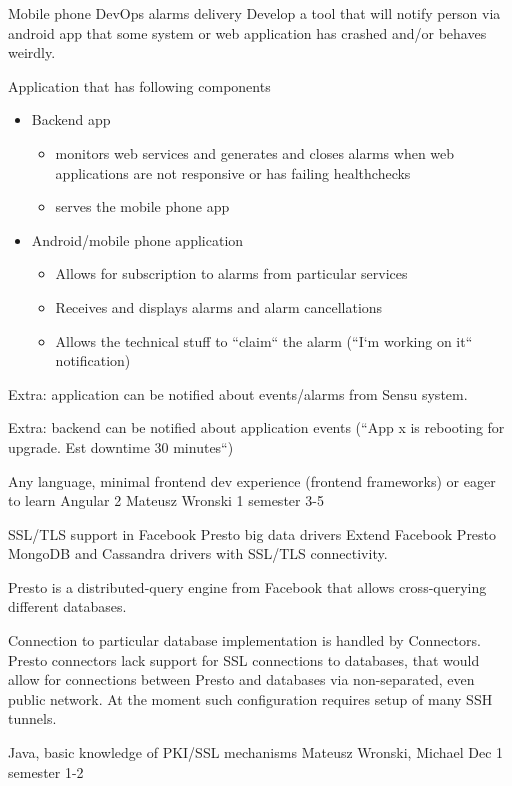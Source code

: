 \begin{project}
{Mobile phone DevOps alarms delivery}
{Develop a tool that will notify person via android app that some system or web application has crashed and/or behaves weirdly.} 
{
Application that has following components
\begin{itemize}
	\item Backend app
		\begin{itemize}
			\item monitors web services and generates and closes alarms when web applications are not responsive or has failing healthchecks
			\item serves the mobile phone app
		\end{itemize}
	\item Android/mobile phone application
		\begin{itemize}
			\item Allows for subscription to alarms from particular services
			\item Receives and displays alarms and alarm cancellations
			\item Allows the technical stuff to ``claim`` the alarm (``I`m working on it`` notification)
		\end{itemize}
\end{itemize}
\bigbreak
Extra: application can be notified about events/alarms from Sensu system.

Extra: backend can be notified about application events (``App x is rebooting for upgrade. Est downtime 30 minutes``)
}
{Any language, minimal frontend dev experience (frontend frameworks) or eager to learn Angular 2}
{Mateusz Wronski}
{1 semester}
{3-5}
\end{project}
\begin{project}
{SSL/TLS support in Facebook Presto big data drivers}
{Extend Facebook Presto MongoDB and Cassandra drivers with SSL/TLS connectivity.} 
{
Presto is a distributed-query engine from Facebook that allows cross-querying different databases.

Connection to particular database implementation is handled by Connectors. Presto connectors lack support for SSL connections to databases, that would allow for connections between Presto and databases via non-separated, even public network. At the moment such configuration requires setup of many SSH tunnels.
}
{Java, basic knowledge of PKI/SSL mechanisms}
{Mateusz Wronski, Michael Dec}
{1 semester}
{1-2}
\end{project}
